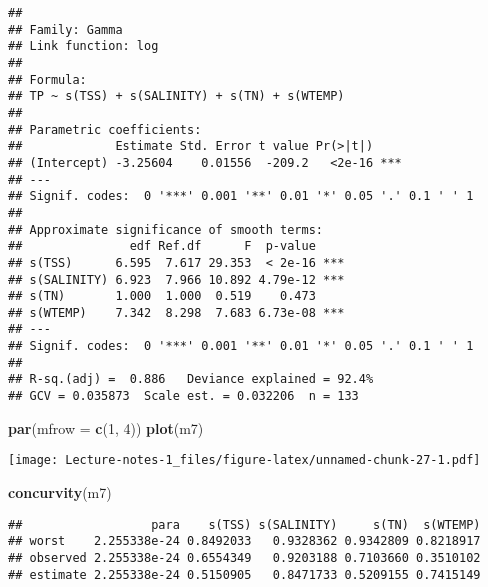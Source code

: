\documentclass[
]{book}
\newenvironment{Shaded}{\begin{snugshade}}{\end{snugshade}}
\newcommand{\DataTypeTok}[1]{\textcolor[rgb]{0.13,0.29,0.53}{#1}}
\newcommand{\DecValTok}[1]{\textcolor[rgb]{0.00,0.00,0.81}{#1}}
\newcommand{\KeywordTok}[1]{\textcolor[rgb]{0.13,0.29,0.53}{\textbf{#1}}}
\newcommand{\NormalTok}[1]{#1}
\newcommand{\OperatorTok}[1]{\textcolor[rgb]{0.81,0.36,0.00}{\textbf{#1}}}
\newcommand{\OtherTok}[1]{\textcolor[rgb]{0.56,0.35,0.01}{#1}}
\begin{document}
\begin{verbatim}
## 
## Family: Gamma 
## Link function: log 
## 
## Formula:
## TP ~ s(TSS) + s(SALINITY) + s(TN) + s(WTEMP)
## 
## Parametric coefficients:
##             Estimate Std. Error t value Pr(>|t|)    
## (Intercept) -3.25604    0.01556  -209.2   <2e-16 ***
## ---
## Signif. codes:  0 '***' 0.001 '**' 0.01 '*' 0.05 '.' 0.1 ' ' 1
## 
## Approximate significance of smooth terms:
##               edf Ref.df      F  p-value    
## s(TSS)      6.595  7.617 29.353  < 2e-16 ***
## s(SALINITY) 6.923  7.966 10.892 4.79e-12 ***
## s(TN)       1.000  1.000  0.519    0.473    
## s(WTEMP)    7.342  8.298  7.683 6.73e-08 ***
## ---
## Signif. codes:  0 '***' 0.001 '**' 0.01 '*' 0.05 '.' 0.1 ' ' 1
## 
## R-sq.(adj) =  0.886   Deviance explained = 92.4%
## GCV = 0.035873  Scale est. = 0.032206  n = 133
\end{verbatim}

\begin{Shaded}
\begin{Highlighting}[]
\KeywordTok{par}\NormalTok{(}\DataTypeTok{mfrow =} \KeywordTok{c}\NormalTok{(}\DecValTok{1}\NormalTok{, }\DecValTok{4}\NormalTok{))}
\KeywordTok{plot}\NormalTok{(m7)}
\end{Highlighting}
\end{Shaded}

\texttt{[image: Lecture-notes-1\_files/figure-latex/unnamed-chunk-27-1.pdf]}

\begin{Shaded}
\begin{Highlighting}[]
\KeywordTok{concurvity}\NormalTok{(m7)}
\end{Highlighting}
\end{Shaded}

\begin{verbatim}
##                  para    s(TSS) s(SALINITY)     s(TN)  s(WTEMP)
## worst    2.255338e-24 0.8492033   0.9328362 0.9342809 0.8218917
## observed 2.255338e-24 0.6554349   0.9203188 0.7103660 0.3510102
## estimate 2.255338e-24 0.5150905   0.8471733 0.5209155 0.7415149
\end{verbatim}

\begin{Shaded}
\end{Shaded}
\end{document}
